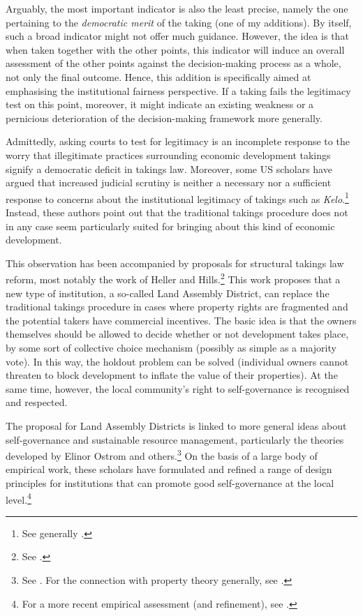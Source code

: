 Arguably, the most important indicator is also the least precise, namely the one pertaining to the {\it democratic merit} of the taking (one of my additions). By itself, such a broad indicator might not offer much guidance. However, the idea is that when taken together with the other points, this indicator will induce an overall assessment of the other points against the decision-making process as a whole, not only the final outcome. Hence, this addition is specifically aimed at emphasising the institutional fairness perspective. If a taking fails the legitimacy test on this point, moreover, it might indicate an existing weakness or a pernicious deterioration of the decision-making framework more generally.

Admittedly, asking courts to test for legitimacy is an incomplete response to the worry that illegitimate practices surrounding economic development takings signify a democratic deficit in takings law. Moreover, some US scholars have argued that increased judicial scrutiny is neither a necessary nor a sufficient response to concerns about the institutional legitimacy of takings such as {\it Kelo}.\footnote{See generally \cite{lehavi07,heller08}.} Instead, these authors point out that the traditional takings procedure does not in any case seem particularly suited for bringing about this kind of economic development.

This observation has been accompanied by proposals for structural takings law reform, most notably the work of Heller and Hills.\footnote{See \cite{heller08}.} This work proposes that a new type of institution, a so-called Land Assembly District, can replace the traditional takings procedure in cases where property rights are fragmented and the potential takers have commercial incentives. The basic idea is that the owners themselves should be allowed to decide whether or not development takes place, by some sort of collective choice mechanism (possibly as simple as a majority vote). In this way, the holdout problem can be solved (individual owners cannot threaten to block development to inflate the value of their properties). At the same time, however, the local community's right to self-governance is recognised and respected.
 
The proposal for Land Assembly Districts is linked to more general ideas about self-governance and sustainable resource management, particularly the theories developed by Elinor Ostrom and others.\footnote{See \cite{ostrom90}. For the connection with property theory generally, see \cite{ostrom10b,rose11,fennel11}.} On the basis of a large body of empirical work, these scholars have formulated and refined a range of design principles for institutions that can promote good self-governance at the local level.\footnote{For a more recent empirical assessment (and refinement), see \cite{cox10}.}


